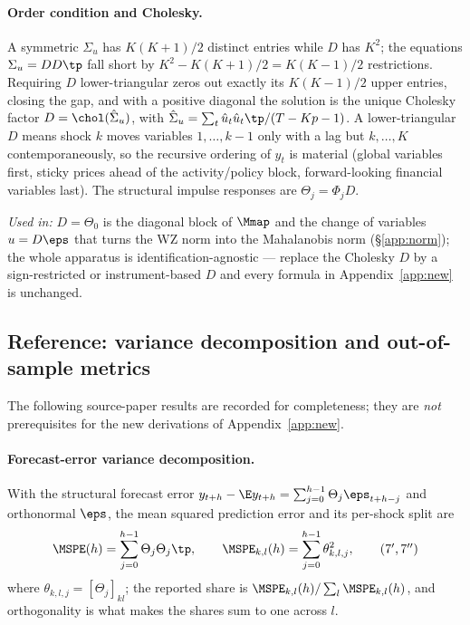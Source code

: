 \paragraph{Order condition and Cholesky.} A symmetric $\Sigma_u$ has $K(K+1)/2$
distinct entries while $D$ has $K^2$; the equations $\Sigma_u=DD\tp$ fall short by
$K^2-K(K+1)/2=K(K-1)/2$ restrictions. Requiring $D$ lower-triangular zeros out
exactly its $K(K-1)/2$ upper entries, closing the gap, and with a positive
diagonal the solution is the unique Cholesky factor
$D=\chol(\hat\Sigma_u)$, with $\hat\Sigma_u=\sum_t\hat u_t\hat u_t\tp/(T-Kp-1)$. A
lower-triangular $D$ means shock $k$ moves variables $1,\dots,k-1$ only with a
lag but $k,\dots,K$ contemporaneously, so the recursive ordering of $y_t$ is
material (global variables first, sticky prices ahead of the activity/policy
block, forward-looking financial variables last). The structural impulse
responses are $\Theta_j=\Phi_jD$.

\medskip
\noindent\textit{Used in:} $D=\Theta_0$ is the diagonal block of $\Mmap$ and the
change of variables $u=D\eps$ that turns the WZ norm into the Mahalanobis norm
(\S\ref{app:norm}); the whole apparatus is identification-agnostic --- replace
the Cholesky $D$ by a sign-restricted or instrument-based $D$ and every formula in
Appendix~\ref{app:new} is unchanged.

\subsection{Reference: variance decomposition and out-of-sample metrics}\label{app:refresults}
The following source-paper results are recorded for completeness; they are
\emph{not} prerequisites for the new derivations of Appendix~\ref{app:new}.

\paragraph{Forecast-error variance decomposition.} With the structural forecast
error $y_{t+h}-\E y_{t+h}=\sum_{j=0}^{h-1}\Theta_j\eps_{t+h-j}$ and orthonormal
$\eps$, the mean squared prediction error and its per-shock split are
\begin{equation}
\MSPE(h)=\sum_{j=0}^{h-1}\Theta_j\Theta_j\tp,\qquad
\MSPE_{k,l}(h)=\sum_{j=0}^{h-1}\theta_{k,l,j}^2,
\tag{7$'$,\,7$''$}\label{aeq:fevd}
\end{equation}
where $\theta_{k,l,j}=[\Theta_j]_{kl}$; the reported share is
$\MSPE_{k,l}(h)/\sum_{l}\MSPE_{k,l}(h)$, and orthogonality is what makes the shares
sum to one across $l$.

